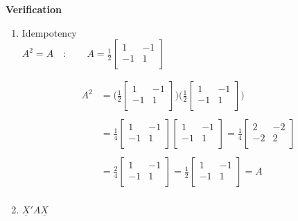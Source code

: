 \documentclass[11pt,a4paper]{article}
\theoremstyle{definition}
\begin{document}
\vspace{0.5cm}

\textbf{Verification}
\begin{enumerate}
\item Idempotency\\

$\displaystyle{A^2 = A\quad :\qquad  A= \frac{1}{2}
\begin{bmatrix}
1 & -1\\
-1 & 1\\
\end{bmatrix}
}$

\begin{align*}
A^2 & = \Bigg(\frac{1}{2}\begin{bmatrix}
1 & -1\\
-1 & 1\\
\end{bmatrix}\Bigg) \Bigg(\frac{1}{2}\begin{bmatrix}
1 & -1\\
-1 & 1\\
\end{bmatrix}\Bigg)\\\\
& = \frac{1}{4}\begin{bmatrix}
1 & -1 \\
-1 & 1\\
\end{bmatrix}\begin{bmatrix}
1 & -1\\
-1 & 1\\
\end{bmatrix}=\frac{1}{4}\begin{bmatrix}
2 & -2\\
-2 & 2\\
\end{bmatrix}\\\\
& = \frac{2}{4}\begin{bmatrix}
1 & -1 \\
-1 & 1\\
\end{bmatrix}=
\frac{1}{2}\begin{bmatrix}
1 & -1\\
-1 & 1 \\
\end{bmatrix}=A\\
\end{align*}


\item $\underline{X}'A\underline{X}$\\


\end{enumerate}
\end{document}
